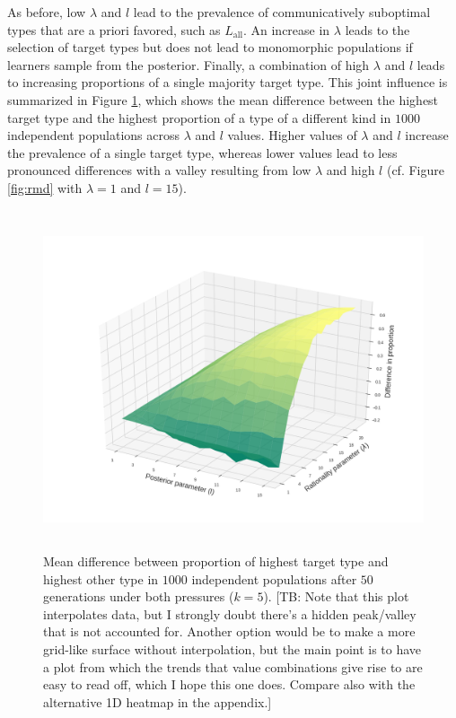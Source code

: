 \documentclass[a4paper, 11pt]{article}
\theoremstyle{Satz}
\newcommand{\tb}[1]{\textcolor[rgb]{.8,.33,.0}{[TB: #1]}}%
\newcommand{\mylang}[1]{\ensuremath{L_{\text{#1}}}\xspace} %
\newcommand{\Lall}{\mylang{all}}
\begin{document}
As before, low $\lambda$ and $l$ lead to the prevalence of communicatively suboptimal types
that are a priori favored, such as $\Lall$. An increase in $\lambda$ leads to the selection of
target types but does not lead to monomorphic populations if learners sample from the
posterior. Finally, a combination of high $\lambda$ and $l$ leads to increasing proportions of
a single majority target type. This joint influence is summarized in Figure \ref{fig:diff}, which shows the mean difference between the highest target type and the highest proportion of a type of a different kind in $1000$ independent populations across $\lambda$ and $l$ values. Higher values of $\lambda$ and $l$ increase the prevalence of a single target type, whereas lower values lead to less pronounced differences with a valley resulting from low $\lambda$ and high $l$ (cf. Figure \ref{fig:rmd} with $\lambda = 1$ and $l=15$). 

\begin{figure}[t]
\centering
\includegraphics[width=1\textwidth,height=10cm,keepaspectratio]{./plots/fig4-3d-incumbents-difference} %
\caption{Mean difference between proportion of highest target type and highest other type in $1000$ independent populations after $50$ generations under both pressures ($k = 5$). \tb{Note that this plot interpolates data, but I strongly doubt there's a hidden peak/valley that is not accounted for. Another option would be to make a more grid-like surface without interpolation, but the main point is to have a plot from which the trends that value combinations give rise to are easy to read off, which I hope this one does. Compare also with the alternative 1D heatmap in the appendix.}}
\label{fig:diff}
\end{figure}
\end{document}
